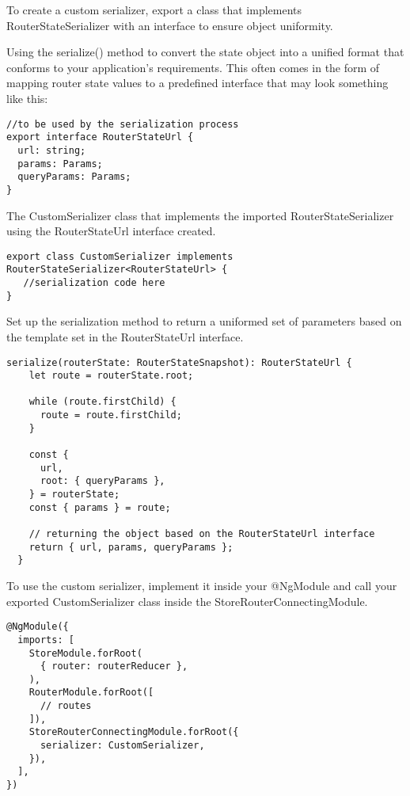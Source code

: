 To create a custom serializer, export a class that implements
RouterStateSerializer with an interface to ensure object uniformity.

Using the serialize() method to convert the state object into a unified format
that conforms to your application's requirements. This often comes in the form
of mapping router state values to a predefined interface that may look something
like this:

\begin{lstlisting}
//to be used by the serialization process
export interface RouterStateUrl {
  url: string;
  params: Params;
  queryParams: Params;
}
\end{lstlisting}

The CustomSerializer class that implements the imported RouterStateSerializer
using the RouterStateUrl interface created.

\begin{lstlisting}
export class CustomSerializer implements RouterStateSerializer<RouterStateUrl> {
   //serialization code here
}
\end{lstlisting}

Set up the serialization method to return a uniformed set of parameters based
on the template set in the RouterStateUrl interface.

\begin{lstlisting}
serialize(routerState: RouterStateSnapshot): RouterStateUrl {
    let route = routerState.root;

    while (route.firstChild) {
      route = route.firstChild;
    }

    const {
      url,
      root: { queryParams },
    } = routerState;
    const { params } = route;

    // returning the object based on the RouterStateUrl interface
    return { url, params, queryParams };
  }

\end{lstlisting}

To use the custom serializer, implement it inside your @NgModule and call your
exported CustomSerializer class inside the StoreRouterConnectingModule.

\begin{lstlisting}
@NgModule({
  imports: [
    StoreModule.forRoot(
      { router: routerReducer },
    ),
    RouterModule.forRoot([
      // routes
    ]),
    StoreRouterConnectingModule.forRoot({
      serializer: CustomSerializer,
    }),
  ],
})
\end{lstlisting}


